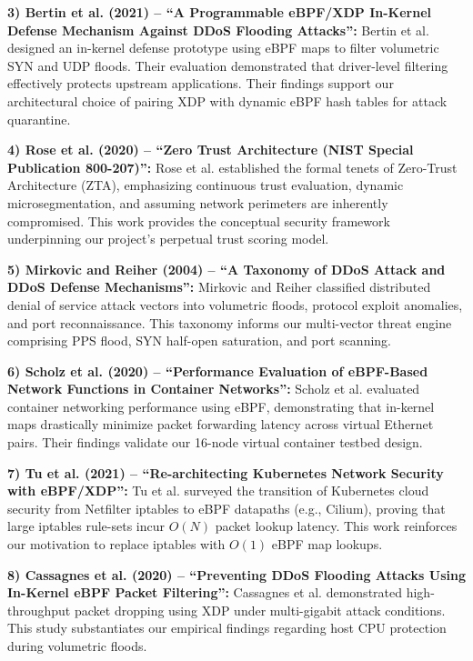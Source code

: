 \documentclass[conference]{IEEEtran}
\begin{document}
\noindent
\textbf{3) Bertin et al. (2021) -- ``A Programmable eBPF/XDP In-Kernel Defense Mechanism Against DDoS Flooding Attacks'':} 
Bertin et al. designed an in-kernel defense prototype using eBPF maps to filter volumetric SYN and UDP floods. Their evaluation demonstrated that driver-level filtering effectively protects upstream applications. Their findings support our architectural choice of pairing XDP with dynamic eBPF hash tables for attack quarantine.

\noindent
\textbf{4) Rose et al. (2020) -- ``Zero Trust Architecture (NIST Special Publication 800-207)'':} 
Rose et al. established the formal tenets of Zero-Trust Architecture (ZTA), emphasizing continuous trust evaluation, dynamic microsegmentation, and assuming network perimeters are inherently compromised. This work provides the conceptual security framework underpinning our project's perpetual trust scoring model.

\noindent
\textbf{5) Mirkovic and Reiher (2004) -- ``A Taxonomy of DDoS Attack and DDoS Defense Mechanisms'':} 
Mirkovic and Reiher classified distributed denial of service attack vectors into volumetric floods, protocol exploit anomalies, and port reconnaissance. This taxonomy informs our multi-vector threat engine comprising PPS flood, SYN half-open saturation, and port scanning.

\noindent
\textbf{6) Scholz et al. (2020) -- ``Performance Evaluation of eBPF-Based Network Functions in Container Networks'':} 
Scholz et al. evaluated container networking performance using eBPF, demonstrating that in-kernel maps drastically minimize packet forwarding latency across virtual Ethernet pairs. Their findings validate our 16-node virtual container testbed design.

\noindent
\textbf{7) Tu et al. (2021) -- ``Re-architecting Kubernetes Network Security with eBPF/XDP'':} 
Tu et al. surveyed the transition of Kubernetes cloud security from Netfilter iptables to eBPF datapaths (e.g., Cilium), proving that large iptables rule-sets incur $O(N)$ packet lookup latency. This work reinforces our motivation to replace iptables with $O(1)$ eBPF map lookups.

\noindent
\textbf{8) Cassagnes et al. (2020) -- ``Preventing DDoS Flooding Attacks Using In-Kernel eBPF Packet Filtering'':} 
Cassagnes et al. demonstrated high-throughput packet dropping using XDP under multi-gigabit attack conditions. This study substantiates our empirical findings regarding host CPU protection during volumetric floods.
\end{document}
